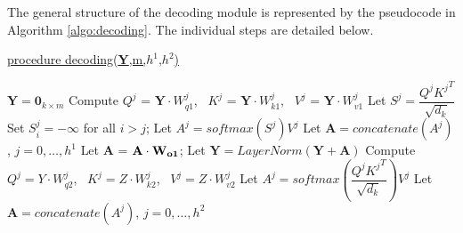 \documentclass[algorithms,article,submit,pdftex,moreauthors]{Definitions/mdpi}
\begin{document}
The general structure of the decoding module is represented by the pseudocode in Algorithm \ref{algo:decoding}. The individual steps are detailed below.

\begin{algorithm2e} 

        \underline{procedure decoding({\bf Y},m,$h^1$,$h^2$)} 
        
        
        \label{dec:start}
        $\textbf{Y} = \textbf{0}_{k \times m}$ \; \label{dec:output}
	{       \label{dec:outer}
            {	\label{dec:decblock1}
                {   \label{dec:self1}
                    Compute $Q^j$ = $\textbf{Y}\cdot W_{q1}^j$,  \, 
                            $K^j$ = $\textbf{Y}\cdot W_{k1}^j$,  \, 
                            $V^j$ = $\textbf{Y}\cdot W_{v1}^j$   \;
                            \label{dec:selfproj}
                    Let $S^j = \dfrac{Q^j{K^j}^T}{\sqrt{d_k}}$\; \label{dec:scaled1}
                    Set $S_i^j=-\infty$ for all $i>j$; 
                    \label{dec:masking}
                    Let $A^j = softmax\left(S^j\right)V^j$
                    \label{dec:softmax}
                }   \label{dec:self2}
                Let $\textbf{A}=concatenate(A^j)$, $j=0,\dots,h^1$\; \label{dec:concatenation1}
                Let {\bf A} = ${\bf A \cdot W_{o1}}$;  \label{dec:outproject1}
                Let $\textbf{Y} = LayerNorm(\textbf{Y} + \textbf{A})$\; \label{dec:norm1}
                {   \label{dec:cross1}
                    Compute $Q^j=Y\cdot W_{q2}^j$, \,
                            $K^j=Z\cdot W_{k2}^j$, \, 
                            $V^j=Z\cdot W_{v2}^j$\;
                    \label{dec:crossproj}
                    Let $A^{j} = softmax\left(\dfrac{Q^j{K^j}^T}{\sqrt{d_k}}\right)V^j$\;
                    \label{dec:scaled2}
                }   \label{dec:cross2}
                Let $\textbf{A}=concatenate(A^j)$, $j=0,\dots,h^2$\;
                \label{dec:concatenation2}
}}
\end{algorithm2e}
\end{document}
